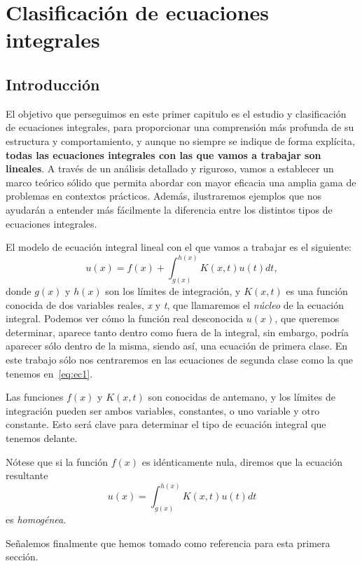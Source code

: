 
\chapter{Clasificación de ecuaciones integrales}\label{ch:primer-capitulo}

\section{Introducción}
El objetivo que perseguimos en este primer capitulo es el estudio y clasificación de ecuaciones integrales, para proporcionar una comprensión más profunda de su estructura y comportamiento, y aunque no siempre se indique de forma explícita, \textbf{todas las ecuaciones integrales con las que vamos a trabajar son lineales}. A través de un análisis detallado y riguroso, vamos a establecer un marco teórico sólido que permita abordar con mayor eficacia una amplia gama de problemas en contextos prácticos. Además, ilustraremos ejemplos que nos ayudarán a entender más fácilmente la diferencia entre los distintos tipos de ecuaciones integrales.

El modelo de ecuación integral lineal con el que vamos a trabajar es el siguiente:
\begin{equation}\label{eq:ec1}
	u(x) = f(x) + \int_{g(x)}^{h(x)} K(x,t)u(t)dt,
\end{equation}
donde $g(x)$ y $h(x)$ son los límites de integración, y $K(x,t)$ es una función conocida de dos variables reales, \textit{x} y \textit{t}, que llamaremos el \textit{núcleo} de la ecuación integral. Podemos ver cómo la función real desconocida $u(x)$, que queremos determinar,  aparece tanto dentro como fuera de la integral, sin embargo, podría aparecer sólo dentro de la misma, siendo así, una ecuación de primera clase. En este trabajo sólo nos centraremos en las ecuaciones de segunda clase como la que tenemos en~\eqref{eq:ec1}.

Las funciones $f(x)$ y $K(x,t)$ son conocidas de antemano, y los límites de integración pueden ser ambos variables, constantes, o uno variable y otro constante. Esto será clave para determinar el tipo de ecuación integral que tenemos delante.\\
\begin{observacion}
	Nótese que si la función $f(x)$ es idénticamente nula, diremos que la ecuación resultante 
	\begin{equation}\label{}
		u(x) = \int_{g(x)}^{h(x)} K(x,t)u(t)dt
	\end{equation}
	es \textit{homogénea}.
\end{observacion}
Señalemos finalmente que hemos tomado \cite{WazWaz} como referencia para esta primera sección.
